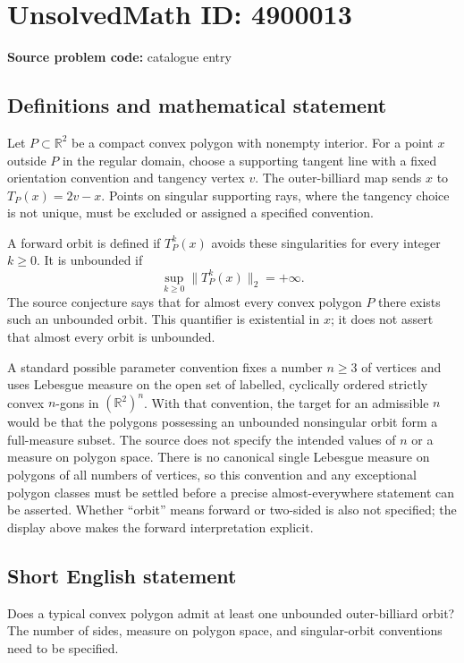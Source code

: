 \documentclass[11pt]{article}
\newcommand{\R}{\mathbb{R}}
\begin{document}
\section*{UnsolvedMath ID: 4900013}
\textbf{Source problem code:} catalogue entry
\subsection{Definitions and mathematical statement}
Let $P\subset\R^2$ be a compact convex polygon with nonempty interior. For a point $x$ outside $P$ in the regular domain, choose a supporting tangent line with a fixed orientation convention and tangency vertex $v$. The outer-billiard map sends $x$ to $T_P(x)=2v-x$. Points on singular supporting rays, where the tangency choice is not unique, must be excluded or assigned a specified convention.

A forward orbit is defined if $T_P^k(x)$ avoids these singularities for every integer $k\geq0$. It is unbounded if
\[
\sup_{k\geq0}\|T_P^k(x)\|_2=+\infty.
\]
The source conjecture says that for almost every convex polygon $P$ there exists such an unbounded orbit. This quantifier is existential in $x$; it does not assert that almost every orbit is unbounded.

A standard possible parameter convention fixes a number $n\geq3$ of vertices and uses Lebesgue measure on the open set of labelled, cyclically ordered strictly convex $n$-gons in $(\R^2)^n$. With that convention, the target for an admissible $n$ would be that the polygons possessing an unbounded nonsingular orbit form a full-measure subset. The source does not specify the intended values of $n$ or a measure on polygon space. There is no canonical single Lebesgue measure on polygons of all numbers of vertices, so this convention and any exceptional polygon classes must be settled before a precise almost-everywhere statement can be asserted. Whether ``orbit'' means forward or two-sided is also not specified; the display above makes the forward interpretation explicit.
\subsection{Short English statement}
Does a typical convex polygon admit at least one unbounded outer-billiard orbit? The number of sides, measure on polygon space, and singular-orbit conventions need to be specified.
\end{document}
